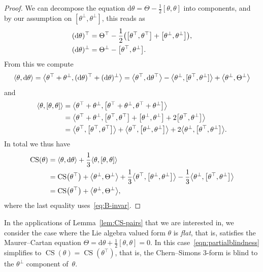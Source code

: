 \documentclass[AHL,Unicode,longabstracts]{cedram}
\renewcommand{\th}{\theta}
\newcommand{\B}[2]{\langle#1,#2\rangle}
\DeclareMathOperator{\CS}{CS}
\renewcommand*{\d}{\mathrm{d}}
\let\originalleft\left
\let\originalright\right
\renewcommand{\left}{\mathopen{}\mathclose\bgroup\originalleft}
\renewcommand{\right}{\aftergroup\egroup\originalright}
\begin{document}
\begin{proof}
We can decompose the equation $\d\th=\Theta-\frac12[\th,\th]$ into components, and by our assumption on $[\th^\perp,\th^\perp]$, this reads as
\begin{equation}\label{eq:dth-decomp}
\begin{aligned}
(\d\th)^\top&=\Theta^\top-\frac12\left(\left[\th^\top,\th^\top\right]+\left[\th^\perp,\th^\perp\right]\right),\\
(\d\th)^\perp&=\Theta^\perp-\left[\th^\top,\th^\perp\right].
\end{aligned}
\end{equation}
From this we compute
\[
\B{\theta}{\d\theta}=
\left\langle\theta^{\top}+\theta^{\perp},(\d\theta)^{\top}+(\d\theta)^{\perp}\right\rangle=\left\langle\theta^{\top},\d\theta^{\top}\right\rangle-\left\langle\theta^{\perp},[\theta^{\top},\theta^{\perp}]\right\rangle+\left\langle\theta^{\perp},\Theta^{\perp}\right\rangle
\]
and
\begin{align*}
\B{\theta}{[\theta,\theta]}&=\left\langle\theta^{\top}+\theta^{\perp},\left[\theta^{\top}+\theta^{\perp},\theta^{\top}+\theta^{\perp}\right]\right\rangle\\
&=\left\langle\theta^{\top}+\theta^{\perp},\left[\theta^{\top},\theta^{\top}\right]+\left[\theta^{\perp},\theta^{\perp}\right]+2\left[\theta^{\top},\theta^{\perp}\right]\right\rangle\\
&=\left\langle\theta^{\top},\left[\theta^{\top},\theta^{\top}\right]\right\rangle+\left\langle\theta^{\top},\left[\theta^{\perp},\theta^{\perp}\right]\right\rangle+2\left\langle\theta^{\perp},\left[\theta^{\top},\theta^{\perp}\right]\right\rangle.
\end{align*}
In total we thus have
\begin{align*}
\CS(\theta)&=\B{\theta}{\d\theta}+\frac{1}{3}\B{\theta}{[\theta,\theta]}\\
&=\CS\left(\theta^{\top}\right)+\left\langle\theta^{\perp},\Theta^{\perp}\right\rangle+\frac{1}{3}\left\langle\theta^{\top},\left[\theta^{\perp},\theta^{\perp}\right]\right\rangle-\frac{1}{3}
\left\langle\theta^{\perp},\left[\theta^{\top},\theta^{\perp}\right]\right\rangle\\
&=\CS\left(\theta^{\top}\right)+\left\langle\theta^{\perp},\Theta^{\perp}\right\rangle,
\end{align*}
where the last equality uses~\eqref{eq:B-invar}.
\end{proof}

\begin{rema}
In the applications of Lemma~\ref{lem:CS-pairs} that we are interested in, we consider the case where the Lie algebra valued form $\theta$ is \emph{flat}, that is, satisfies the Maurer--Cartan equation $\Theta=\d\theta+\frac{1}{2}[\theta,\theta]=0$. In this case~\eqref{eqn:partialblindness} simplifies to $\CS(\theta)=\CS(\theta^{\top})$, that is, the Chern--Simons $3$-form is blind to the $\theta^{\perp}$ component of~$\theta$.
\end{rema}
\end{document}
